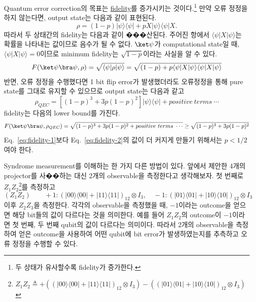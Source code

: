 Quantum error correction의 목표는 \hyperref[sec:quantum-fidelity]{fidelity}를 증가시키는 것이다.\footnote{두 상태가 유사할수록 fidelity가 증가한다.}  만약 오류 정정을 하지 않는다면, output state는 다음과 같이 표현된다.
\begin{equation*}
    \rho=(1-p)|\psi\rangle\langle\psi|+p X|\psi\rangle\langle\psi| X .
\end{equation*}
따라서 두 상태간의 fidelity는 다음과 같이 ���산된다. 주어진 항에서 $\langle \psi | X | \psi \rangle$는 확률을 나타내는 값이므로 음수가 될 수 없다. $\ket \psi$가 computational state일 때, $\langle \psi | X | \psi \rangle = 0$이므로 minimum fidelity는 $\sqrt{1-p}$이라는 사실을 알 수 있다.
\begin{equation}
    F(\ket \psi \bra \psi, \rho)=\sqrt{\langle\psi| \rho|\psi\rangle}=\sqrt{(1-p)+p\langle\psi| X|\psi\rangle\langle\psi| X|\psi\rangle} \label{eq:fidelity-1}
\end{equation}
반면, 오류 정정을 수행했다면 1 bit flip error가 발생했더라도 오류정정을 통해 pure state를 그대로 유지할 수 있으므로 output state는 다음과 같고 
\begin{equation*}
    \rho_{QEC}=\left[(1-p)^3+3 p(1-p)^2\right]|\psi\rangle\langle\psi| + positive\ terms\ \cdots
\end{equation*}
fidelity는 다음의 lower bound를 가진다.
\begin{equation}
    F(\ket \psi \bra \psi, \rho_{QEC})  = \sqrt{(1-p)^3+3 p(1-p)^2 + positive\ terms\ \cdots}  \ge \sqrt{(1-p)^3+3 p(1-p)^2} \label{eq:fidelity-2}
\end{equation}
Eq.~\eqref{eq:fidelity-1}보다 Eq.~\eqref{eq:fidelity-2}의 값이 더 커지게 만들기 위해서는 $p < 1/2$여야 한다.

\vspace{1em}

Syndrome measurement를 이해하는 한 가지 다른 방법이 있다. 앞에서 제안한 4개의 projector를 사��하는 대신 2개의 observable을 측정한다고 생각해보자. 첫 번째로 $Z_1Z_2$\footnote{$Z_1Z_2 \triangleq  +\left((|00\rangle\langle 00|+|11\rangle\langle 11|)_{12} \otimes I_3\right) - \left((|01\rangle\langle 01|+|10\rangle\langle 10|)_{12} \otimes I_3 \right)$}를 측정하고
\begin{equation*}
    (Z_1Z_2) \qquad +1:(|00\rangle\langle 00|+|11\rangle\langle 11|)_{12} \otimes I_3, \quad-1:(|01\rangle\langle 01|+|10\rangle\langle 10|)_{12} \otimes I_3
\end{equation*}
이후 $Z_2Z_3$을 측정한다. 각각의 observable을 측정했을 때, $-1$이라는 outcome을 얻으면 해당 bit들의 값이 다르다는 것을 의미한다. 예를 들어 $Z_1Z_2$의 outcome이 $-1$이라면 첫 번째, 두 번째 qubit의 값이 다르다는 의미이다.
따라서 2개의 observable을 측정하여 얻은 outcome을 사용하여 어떤 qubit에 bit error가 발생하였는지를 추측하고 오류 정정을 수행할 수 있다. 


